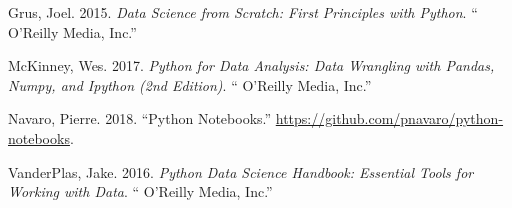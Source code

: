 \documentclass[12pt,]{book}
\numberwithin{equation}{section}
\numberwithin{countremarque}{section}
\begin{document}
\hypertarget{ref-grus_2015_data}{}
Grus, Joel. 2015. \emph{Data Science from Scratch: First Principles with
Python}. `` O'Reilly Media, Inc.''

\hypertarget{ref-mckinney_2017_python}{}
McKinney, Wes. 2017. \emph{Python for Data Analysis: Data Wrangling with
Pandas, Numpy, and Ipython (2nd Edition)}. `` O'Reilly Media, Inc.''

\hypertarget{ref-navaro_python}{}
Navaro, Pierre. 2018. ``Python Notebooks.''
\url{https://github.com/pnavaro/python-notebooks}.

\hypertarget{ref-vanderplas2016python}{}
VanderPlas, Jake. 2016. \emph{Python Data Science Handbook: Essential
Tools for Working with Data}. `` O'Reilly Media, Inc.''
\end{document}
